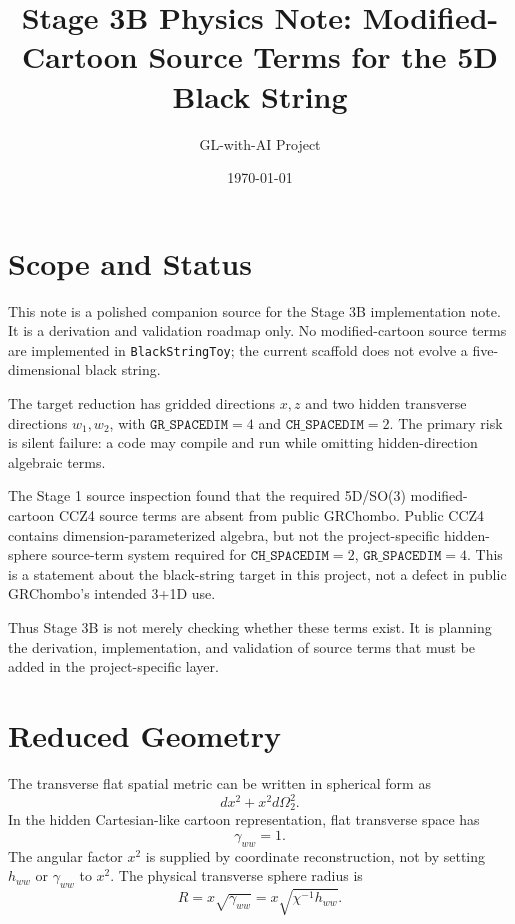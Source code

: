 \documentclass[11pt]{article}
\title{Stage 3B Physics Note: Modified-Cartoon Source Terms for the 5D Black String}
\author{GL-with-AI Project}
\date{\today}
\newcommand{\GRSP}{\texttt{GR\_SPACEDIM}}
\newcommand{\CHSP}{\texttt{CH\_SPACEDIM}}
\begin{document}
\maketitle

\section{Scope and Status}

This note is a polished companion source for the Stage 3B implementation note.
It is a derivation and validation roadmap only. No modified-cartoon source
terms are implemented in \texttt{BlackStringToy}; the current scaffold does not
evolve a five-dimensional black string.

The target reduction has gridded directions \(x,z\) and two hidden transverse
directions \(w_1,w_2\), with \(\GRSP=4\) and \(\CHSP=2\). The primary risk is
silent failure: a code may compile and run while omitting hidden-direction
algebraic terms.

The Stage 1 source inspection found that the required 5D/SO(3)
modified-cartoon CCZ4 source terms are absent from public GRChombo. Public
CCZ4 contains dimension-parameterized algebra, but not the project-specific
hidden-sphere source-term system required for \(\CHSP=2\), \(\GRSP=4\). This
is a statement about the black-string target in this project, not a defect in
public GRChombo's intended 3+1D use.

Thus Stage 3B is not merely checking whether these terms exist. It is planning
the derivation, implementation, and validation of source terms that must be
added in the project-specific layer.

\section{Reduced Geometry}

The transverse flat spatial metric can be written in spherical form as
\begin{equation}
  dx^2 + x^2 d\Omega_2^2 .
\end{equation}
In the hidden Cartesian-like cartoon representation, flat transverse space has
\begin{equation}
  \gamma_{ww}=1.
\end{equation}
The angular factor \(x^2\) is supplied by coordinate reconstruction, not by
setting \(h_{ww}\) or \(\gamma_{ww}\) to \(x^2\). The physical transverse sphere
radius is
\begin{equation}
  R = x\sqrt{\gamma_{ww}} = x\sqrt{\chi^{-1}h_{ww}} .
\end{equation}
\end{document}

